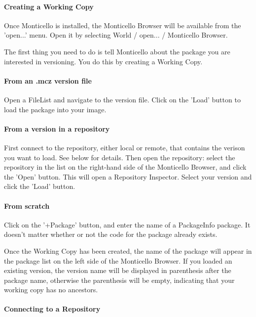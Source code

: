 \documentclass[a4paper,10pt,twoside]{book}
\begin{document}
\paragraph{Creating a Working Copy}

Once Monticello is installed, the Monticello Browser will be available from the 'open...' menu. Open it by selecting World / open... / Monticello Browser.

The first thing you need to do is tell Monticello about the package you are interested in versioning. You do this by creating a Working Copy.

\paragraph{From an .mcz version file}
Open a FileList and navigate to the version file. Click on the 'Load' button to load the package into your image.

\paragraph{From a version in a repository}

First connect to the repository, either local or remote, that contains the verison you want to load. See below for details. Then open the repository: select the repository in the list on the right-hand side of the Monticello Browser, and click the 'Open' button. This will open a Repository Inspector. Select your version and click the 'Load' button.

\paragraph{From scratch}

Click on the '+Package' button, and enter the name of a PackageInfo package. It doesn't matter whether or not the code for the package already exists.

Once the Working Copy has been created, the name of the package will appear in the package list on the left side of the Monticello Browser. If you loaded an existing version, the version name will be displayed in parenthesis after the package name, otherwise the parenthesis will be empty, indicating that your working copy has no ancestors.

\paragraph{Connecting to a Repository}
\end{document}
